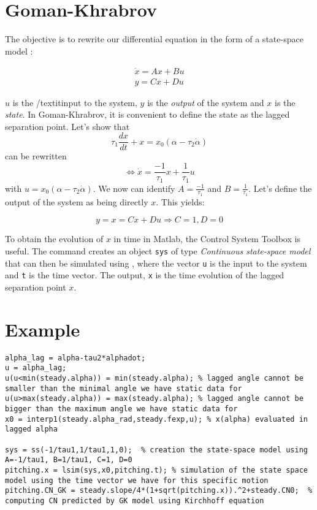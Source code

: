 \documentclass{article}
\begin{document}
\section*{Goman-Khrabrov}

The objective is to rewrite our differential equation in the form of a state-space model : 

\begin{eqnarray}
\dot{x} = Ax+Bu \\
y = Cx+Du
\end{eqnarray}

\noindent $u$ is the /textit{input} to the system, $y$ is the \textit{output} of the system and $x$ is the \textit{state}. In Goman-Khrabrov, it is convenient to define the state as the lagged separation point. Let's show that
\begin{equation}
\tau_1 \frac{dx}{dt} + x = x_0(\alpha-\tau_2 \dot{\alpha})
\end{equation}
can be rewritten 
\begin{equation}
\Leftrightarrow \dot{x} = \frac{-1}{\tau_1}x +\frac{1}{\tau_1}u
\end{equation}
\noindent with $u=x_0(\alpha-\tau_2 \dot{\alpha})$. We now can identify $A=\frac{-1}{\tau_1}$ and $B=\frac{1}{\tau_1}$. Let's define the output of the system as being directly $x$. This yields:

\begin{equation}
y = x = Cx+Du \Rightarrow C=1, D=0
\end{equation}

To obtain the evolution of $x$ in time in Matlab, the Control System Toolbox is useful. The command  creates an object \texttt{sys} of type \textit{Continuous state-space model} that can then be simulated using , where the vector \texttt{u} is the input to the system and \texttt{t} is the time vector. The output, \texttt{x} is the time evolution of the lagged separation point $x$.

\section*{Example}
 
\begin{lstlisting}
alpha_lag = alpha-tau2*alphadot;
u = alpha_lag; 
u(u<min(steady.alpha)) = min(steady.alpha); % lagged angle cannot be smaller than the minimal angle we have static data for
u(u>max(steady.alpha)) = max(steady.alpha); % lagged angle cannot be bigger than the maximum angle we have static data for
x0 = interp1(steady.alpha_rad,steady.fexp,u); % x(alpha) evaluated in lagged alpha

sys = ss(-1/tau1,1/tau1,1,0);  % creation the state-space model using A=-1/tau1, B=1/tau1, C=1, D=0
pitching.x = lsim(sys,x0,pitching.t); % simulation of the state space model using the time vector we have for this specific motion
pitching.CN_GK = steady.slope/4*(1+sqrt(pitching.x)).^2+steady.CN0;  % computing CN predicted by GK model using Kirchhoff equation
\end{lstlisting}
\end{document}
